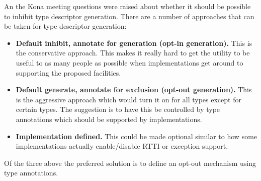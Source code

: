 An the Kona meeting questions were raised about whether it should be possible
to inhibit type descriptor generation. There are a number of approaches that
can be taken for type descriptor generation:

\begin{itemize}

 \item \textbf{Default inhibit, annotate for generation (opt-in generation).}
This is the conservative approach. This makes it really hard to get the
utility to be useful to as many people as possible when implementations get
around to supporting the proposed facilities.

 \item \textbf{Default generate, annotate for exclusion (opt-out generation).}
This is the aggressive approach which would turn it on for all types except
for certain types. The suggestion is to have this be controlled by type
annotations which should be supported by implementations.

 \item \textbf{Implementation defined.} This could be made optional similar to
how some implementations actually enable/disable RTTI or exception support.

\end{itemize}

Of the three above the preferred solution is to define an opt-out mechanism using type annotations.